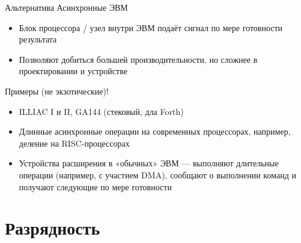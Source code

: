 \documentclass[xetex,aspectratio=43]{beamer}
\begin{document}
\begin{frame}{Альтернатива}
    Асинхронные ЭВМ

    \begin{itemize}
        \tightlist
        \item
        Блок процессора / узел внутри ЭВМ подаёт сигнал по мере готовности
        результата
        \item
        Позволяют добиться большей производительности, но сложнее в
        проектировании и устройстве
    \end{itemize}

    Примеры (не экзотические)!

    \begin{itemize}
        \tightlist
        \item
        ILLIAC I и II, GA144 (стековый, дла Forth)
        \item
        Длинные асинхронные операции на современных процессорах, например,
        деление на RISC-процессорах
    \end{itemize}

    \pause

    \begin{itemize}
        \item
        Устройства расширения в «обычных» ЭВМ --- выполняют длительные
        операции (например, с участием DMA), сообщают о выполнении команд и
        получают следующие по мере готовности
    \end{itemize}
\end{frame}

\section{Разрядность}
\end{document}
